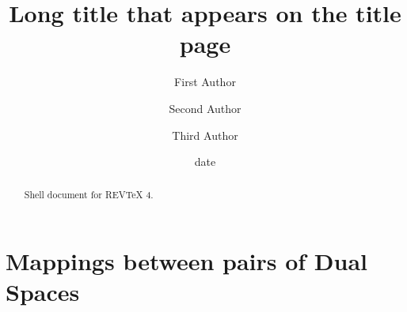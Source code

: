 \documentclass[aps,preprint]{revtex4}%
\begin{document}
\title[Short title for running header]{Long title that appears on the title page}
\author{First Author}
\author{Second Author}
\author{Third Author}

\begin{abstract}
Shell document for REV\TeX{} 4.

\end{abstract}
\date[Date text]{date}




\maketitle
\tableofcontents


\section{Mappings between pairs of Dual Spaces}
\end{document}
